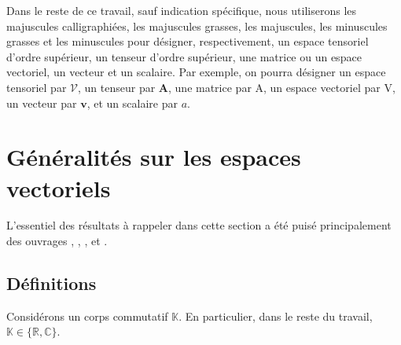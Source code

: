 \documentclass[11pt,a4paper,oneside]{book}
\def\R{\mathbb R}
\def\C{\mathbb C}
\def\K{\mathbb K}
\def\V{\mathcal V}
\newcommand{\mbf}[1]{\mathbf{#1}}
\begin{document}
 Dans le reste de ce travail, sauf indication spécifique, nous utiliserons les majuscules calligraphiées, les majuscules grasses, les majuscules, les minuscules grasses et les minuscules pour désigner, respectivement, un espace tensoriel d'ordre supérieur, un tenseur d'ordre supérieur, une matrice ou un espace vectoriel, un vecteur et un scalaire. Par exemple, on pourra désigner un espace tensoriel par $ \V $, un tenseur par $ \mbf{A} $, une matrice par A, un espace vectoriel par V, un vecteur par $ \mbf{v} $, et un scalaire par $ a $.
\section{Généralités sur les espaces vectoriels}\label{sec:1.1evectoriels}
L'essentiel des résultats à rappeler dans cette section a été puisé principalement des ouvrages \cite{balac2003algèbre}, \cite{Michel2013},  \cite{hackbusch2012tensor}, \cite{BalbineAIMS} et \cite{Annick2014}.
\subsection{Définitions}
Considérons un corps commutatif $ \K $. En particulier, dans le reste du travail, $ \K\in\{\R,\C \}$.
\end{document}
